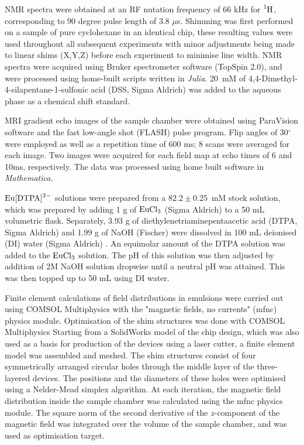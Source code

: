 NMR spectra were obtained at an RF nutation frequency of 66 kHz for
$\ce{^1H}$, corresponding to 90 degree pulse length of
3.8 $\mu$s. Shimming was first performed on a sample of pure cyclohexane
in an identical chip, these resulting values were used throughout all subsequent experiments with
minor adjustments being made to linear shims (X,Y,Z) before each experiment to minimise line width. NMR spectra were acquired using Bruker spectrometer software (TopSpin 2.0),
and were processed using home-built scripts written in \textit{Julia}. \citep{Bezanson:2017gd}
20~mM of 4,4-Dimethyl-4-silapentane-1-sulfonic acid (DSS, Sigma Aldrich) was added to the aqueous phase
as a chemical shift standard.

MRI gradient echo images of the sample chamber were obtained using ParaVision software and the fast low-angle shot (FLASH) pulse program. Flip angles of 30$^\circ$ were employed as well as a repetition time of 600 ms; 8 scans were averaged for each image. Two images were acquired for each field map at echo times of 6 and 10ms, respectively. The data was processed using home built software in \textit{Mathematica}.

$\ce{Eu[DTPA]^{2-}}$ solutions were prepared  from a $82.2\pm0.25$~mM
stock solution, which was prepared by adding 1 g of $\ce{EuCl_3}$
(Sigma Aldrich) to a 50 mL volumetric flask. Separately,
3.93 g of diethylenetriaminepentaacetic acid (DTPA, Sigma Aldrich)
and 1.99 g of NaOH (Fischer) were dissolved in 100 mL deionised (DI) water (Sigma Aldrich) .
An equimolar amount of the DTPA solution was added to the $\ce{EuCl_3}$ solution. The pH of this solution was then adjusted by addition of 2M NaOH solution dropwise until a neutral pH was attained.
This was then topped up to 50 mL using DI water.

Finite element calculations of field distributions in emulsions
 were carried out using COMSOL Multiphysics with the "magnetic fields, no currents" (mfnc) physics module.
Optimisation of the shim structures was done with COMSOL Multiphysics \citep{comsolmp} Starting from a SolidWorks model
of the chip design, which was also used as a basis for production of the devices using
a laser cutter, a finite element model was assembled and meshed. The shim structures consist
of four symmetrically arranged circular holes through the middle layer of the three-layered
devices. The positions and the diameters of these
holes were optimised using a Nelder-Mead simplex algorithm. At each iteration, the magnetic
field distribution inside the sample chamber was calculated using the mfnc physics module.
The square norm of the second derivative of the $z$-component of the magnetic field was integrated
over the volume of the sample chamber, and was used as optimisation target.

